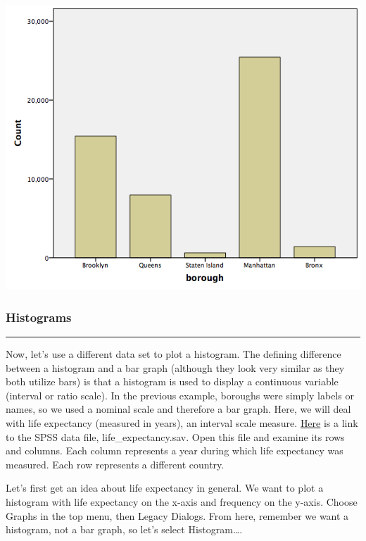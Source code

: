 \documentclass[
]{book}
\begin{document}
\includegraphics{img/1.4.17.png}

\hypertarget{histograms}{%
\subsubsection{Histograms}\label{histograms}}

\begin{center}\rule{0.5\linewidth}{0.5pt}\end{center}

Now, let's use a different data set to plot a histogram. The defining difference between a histogram and a bar graph (although they look very similar as they both utilize bars) is that a histogram is used to display a continuous variable (interval or ratio scale). In the previous example, boroughs were simply labels or names, so we used a nominal scale and therefore a bar graph. Here, we will deal with life expectancy (measured in years), an interval scale measure. \href{https://github.com/CrumpLab/statisticsLab/blob/master/data/spssdata/life_expectancy.sav}{Here} is a link to the SPSS data file, life\_expectancy.sav. Open this file and examine its rows and columns. Each column represents a year during which life expectancy was measured. Each row represents a different country.

Let's first get an idea about life expectancy in general. We want to plot a histogram with life expectancy on the x-axis and frequency on the y-axis. Choose {Graphs} in the top menu, then {Legacy Dialogs}. From here, remember we want a histogram, not a bar graph, so let's select {Histogram\ldots{}}.
\end{document}
